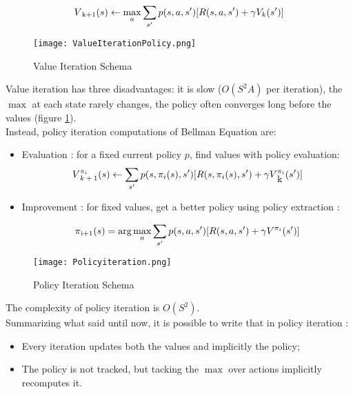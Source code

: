 \begin{equation}
	V\textsubscript{k+1}(s) \leftarrow \max_{a} \sum_{s'} p(s, a, s') [R(s, a, s') + \gamma V_k(s')]
\end{equation}

\begin{figure}[h!]
	\centering
	\texttt{[image: ValueIterationPolicy.png]}
	\caption{Value Iteration Schema}
	\label{fig:ValueiterationPolicy}
\end{figure}

Value iteration has three disadvantages: it is slow ($O(S^2A)$ per iteration), the $\max$ at each state rarely changes, the policy often converges long before the values (figure \ref{fig:ValueiterationPolicy}). \\

Instead, policy iteration computations of Bellman Equation are:

\begin{itemize}
	\item Evaluation : for a fixed current policy $p$, find values with policy evaluation:
		\begin{equation}
			V\textsupsub{$\pi_i$}{$k+1$}(s) \leftarrow \sum_{s'}p(s, \pi_i(s), s')[R(s, \pi_i(s), s') + \gamma V\textsupsub{$\pi_i$}{k}(s')]
		\end{equation}
	
	\item Improvement : for fixed values, get a better policy using policy extraction :
	
	\begin{equation}
		\pi\textsubscript{i+1}(s) = \arg \max_{a} \sum_{s'} p(s, a, s')[R(s, a, s') + \gamma V\textsuperscript{$\pi_i$}(s')]
	\end{equation}
\end{itemize}

\begin{figure}[h!]
	\centering
	\texttt{[image: Policyiteration.png]}
	\caption{Policy Iteration Schema}
	\label{fig:PolicyIteration}
\end{figure}

The complexity of policy iteration is $O(S^2)$. \\

Summarizing what said until now, it is possible to write that in policy iteration : \\ 

\begin{itemize}
	\item Every iteration updates both the values and implicitly the policy;
	\item The policy is not tracked, but tacking the $\max$ over actions implicitly recomputes it.
\end{itemize}

